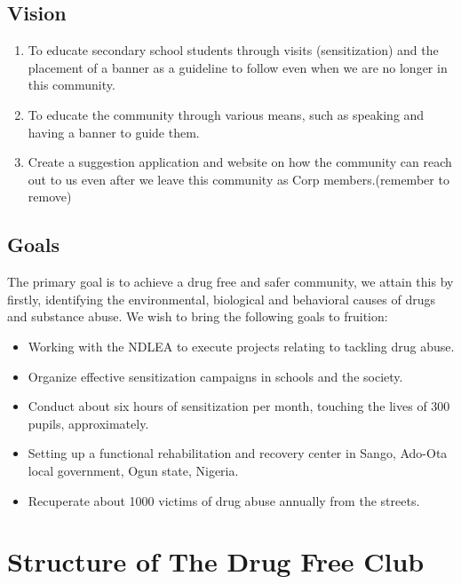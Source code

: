 \documentclass{report}
\begin{document}
\section{Vision}
\begin{enumerate}
    \item 
    To educate secondary school students through visits (sensitization) and the placement of a banner as a guideline to follow even when we are no longer in this community.
    
    \item
    To educate the community through various means, such as speaking and having a banner to guide them.
    
    \item
    Create a suggestion application and website on how the community can reach out to us even after we leave this community as Corp members.(remember to remove)
\end{enumerate}

\section{Goals}
The primary goal is to achieve a drug free and safer community, we attain this by firstly, identifying the environmental, biological and behavioral causes of drugs and substance abuse. We wish to bring the following goals to fruition:
\begin{itemize}
    \item 
    Working with the NDLEA to execute projects relating to tackling drug abuse.
    
    \item
    Organize effective sensitization campaigns in schools and the society.
    
    \item
    Conduct about six hours of sensitization per month, touching the lives of 300 pupils, approximately.
    
    \item
    Setting up a functional rehabilitation and recovery center in Sango, Ado-Ota local government, Ogun state, Nigeria.
    
    \item
    Recuperate about 1000 victims of drug abuse annually from the streets.
\end{itemize}


\chapter{Structure of The Drug Free Club}
\end{document}
